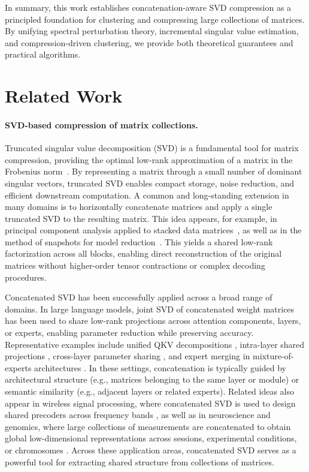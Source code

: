 \documentclass[10pt]{article} %
\begin{document}
In summary, this work establishes concatenation-aware SVD compression as a principled foundation for clustering and compressing large collections of matrices.
By unifying spectral perturbation theory, incremental singular value estimation, and compression-driven clustering, we provide both theoretical guarantees and practical algorithms.


\section{Related Work}

\paragraph{SVD-based compression of matrix collections.}
Truncated singular value decomposition (SVD) is a fundamental tool for matrix compression, providing the optimal low-rank approximation of a matrix in the Frobenius norm~\citep{EckartYoung1936,mirsky1960,jolliffe2002pca,halko2011finding}.
By representing a matrix through a small number of dominant singular vectors, truncated SVD enables compact storage, noise reduction, and efficient downstream computation.
A common and long-standing extension in many domains is to horizontally concatenate matrices and apply a single truncated SVD to the resulting matrix.
This idea appears, for example, in principal component analysis applied to stacked data matrices~\citep{jolliffe2002pca}, as well as in the method of snapshots for model reduction~\citep{sirovich1987turbulence}.
This yields a shared low-rank factorization across all blocks, enabling direct reconstruction of the original matrices without higher-order tensor contractions or complex decoding procedures.

Concatenated SVD has been successfully applied across a broad range of domains.
In large language models, joint SVD of concatenated weight matrices has been used to share low-rank projections across attention components, layers, or experts, enabling parameter reduction while preserving accuracy.
Representative examples include unified QKV decompositions \citep{wang2025qsvd}, intra-layer shared projections \citep{lu2025skipcat}, cross-layer parameter sharing \citep{wang2025commonkv}, and expert merging in mixture-of-experts architectures \citep{li2025submoe,chaichana2025drm}.
In these settings, concatenation is typically guided by architectural structure (e.g., matrices belonging to the same layer or module) or semantic similarity (e.g., adjacent layers or related experts). Related ideas also appear in wireless signal processing, where concatenated SVD is used to design shared precoders across frequency bands \citep{zhang2016low}, as well as in neuroscience and genomics, where large collections of measurements are concatenated to obtain global low-dimensional representations across sessions, experimental conditions, or chromosomes \citep{nietz2023calcium,zhou2023genome}.
Across these application areas, concatenated SVD serves as a powerful tool for extracting shared structure from collections of matrices.
\end{document}

